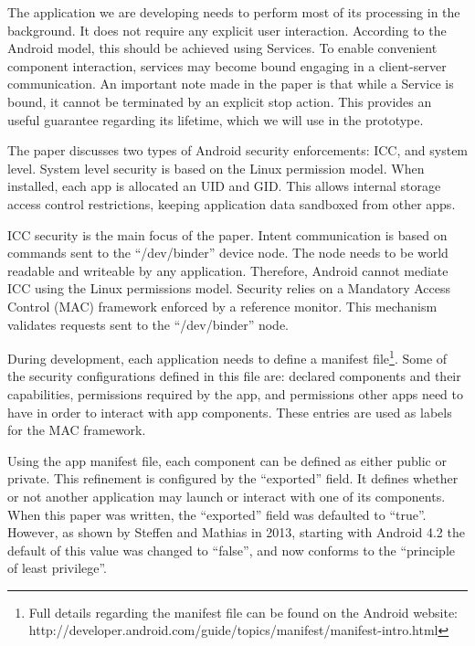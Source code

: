 The application we are developing needs to perform most of its processing in the background. It does not require any explicit user interaction. According to the Android model, this should be achieved using Services. To enable convenient component interaction, services may become bound engaging in a client-server communication. An important note made in the paper is that while a Service is bound, it cannot be terminated by an explicit stop action. This provides an useful guarantee regarding its lifetime, which we will use in the prototype.

The paper discusses two types of Android security enforcements: ICC, and system level. System level security is based on the Linux permission model. When installed, each app is allocated an UID and GID. This allows internal storage access control restrictions, keeping application data sandboxed from other apps.

ICC security is the main focus of the paper. Intent communication is based on commands sent to the ``/dev/binder'' device node. The node needs to be world readable and writeable by any application. Therefore, Android cannot mediate ICC using the Linux permissions model. Security relies on a Mandatory Access Control (MAC) framework enforced by a reference monitor. This mechanism validates requests sent to the ``/dev/binder'' node. 

During development, each application needs to define a manifest file\footnote{Full details regarding the manifest file can be found on the Android website: http://developer.android.com/guide/topics/manifest/manifest-intro.html}. Some of the security configurations defined in this file are: declared components and their capabilities, permissions required by the app, and permissions other apps need to have in order to interact with app components. These entries are used as labels for the MAC framework. 

Using the app manifest file, each component can be defined as either public or private. This refinement is configured by the ``exported'' field. It defines whether or not another application may launch or interact with one of its components. When this paper was written, the ``exported'' field was defaulted to ``true''. However, as shown by Steffen and Mathias \cite{liebergeld2013android}  in 2013, starting with Android 4.2  the default of this value was changed to ``false'', and now conforms to the ``principle of least privilege''.

